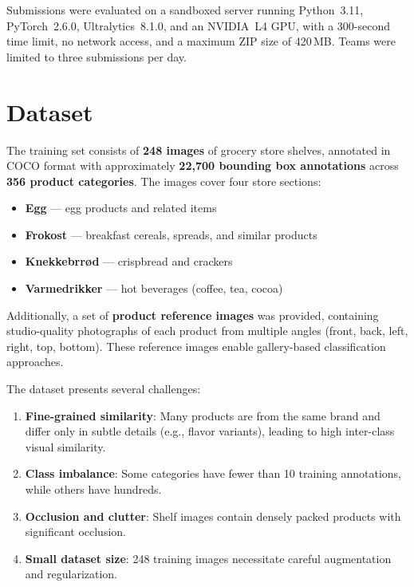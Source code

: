 \documentclass[11pt,a4paper]{article}
\begin{document}
Submissions were evaluated on a sandboxed server running Python~3.11, PyTorch~2.6.0, Ultralytics~8.1.0, and an NVIDIA~L4 GPU, with a 300-second time limit, no network access, and a maximum ZIP size of 420\,MB.
Teams were limited to three submissions per day.

\section{Dataset}
\label{sec:dataset}

The training set consists of \textbf{248 images} of grocery store shelves, annotated in COCO format with approximately \textbf{22,700 bounding box annotations} across \textbf{356 product categories}.
The images cover four store sections:

\begin{itemize}    \item \textbf{Egg} --- egg products and related items
    \item \textbf{Frokost} --- breakfast cereals, spreads, and similar products
    \item \textbf{Knekkebrr{\o}d} --- crispbread and crackers
    \item \textbf{Varmedrikker} --- hot beverages (coffee, tea, cocoa)
\end{itemize}

Additionally, a set of \textbf{product reference images} was provided, containing studio-quality photographs of each product from multiple angles (front, back, left, right, top, bottom).
These reference images enable gallery-based classification approaches.

The dataset presents several challenges:
\begin{enumerate}    \item \textbf{Fine-grained similarity}: Many products are from the same brand and differ only in subtle details (e.g., flavor variants), leading to high inter-class visual similarity.
    \item \textbf{Class imbalance}: Some categories have fewer than 10 training annotations, while others have hundreds.
    \item \textbf{Occlusion and clutter}: Shelf images contain densely packed products with significant occlusion.
    \item \textbf{Small dataset size}: 248 training images necessitate careful augmentation and regularization.
\end{enumerate}
\end{document}
